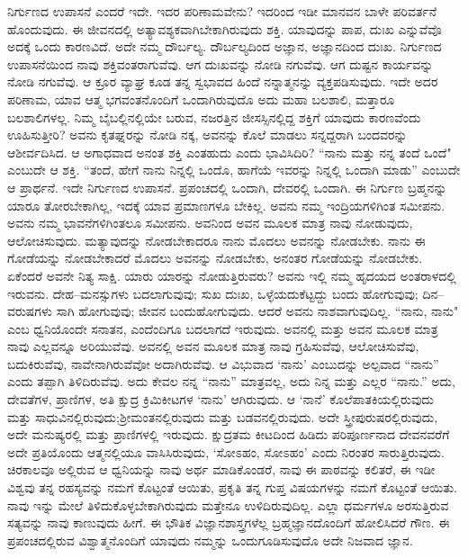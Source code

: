 ನಿರ್ಗುಣದ ಉಪಾಸನೆ ಎಂದರೆ ಇದೇ. ಇದರ ಪರಿಣಾಮವೇನು? ಇದರಿಂದ ಇಡೀ ಮಾನವನ ಬಾಳೇ ಪರಿವರ್ತನೆ ಹೊಂದುವುದು. ಈ ಜೀವನದಲ್ಲಿ ಅತ್ಯಾವಶ್ಯಕವಾಗಿ\break ಬೇಕಾಗಿರುವುದು ಶಕ್ತಿ. ಯಾವುದನ್ನು ಪಾಪ, ದುಃಖ ಎನ್ನುವೆವೊ ಅದಕ್ಕೆ ಒಂದು ಕಾರಣವಿದೆ. ಅದೇ ನಮ್ಮ ದೌರ್ಬಲ್ಯ. ದೌರ್ಬಲ್ಯದಿಂದ ಅಜ್ಞಾನ, ಅಜ್ಞಾನದಿಂದ ದುಃಖ. ನಿರ್ಗುಣದ ಉಪಾಸನೆಯಿಂದ ನಾವು ಶಕ್ತಿವಂತರಾಗುವೆವು. ಆಗ ದುಃಖವನ್ನು ನೋಡಿ ನಗುವೆವು. ಆಗ ದುಷ್ಟನ ಕಾರ್ಯವನ್ನು ನೋಡಿ ನಗುವೆವು. ಆ ಕ್ರೂರ ವ್ಯಾಘ್ರ ಕೂಡ ತನ್ನ ಸ್ವಭಾವದ ಹಿಂದೆ ನನ್ನಾತ್ಮನನ್ನು ವ್ಯಕ್ತಪಡಿಸುವುದು. ಇದೇ ಅದರ ಪರಿಣಾಮ, ಯಾವ ಆತ್ಮ ಭಗವಂತನೊಂದಿಗೆ ಒಂದಾಗಿರುವುದೊ ಅದು ಮಹಾ ಬಲಶಾಲಿ, ಮತ್ತಾರೂ ಬಲಶಾಲಿಗಳಲ್ಲ. ನಿಮ್ಮ ಬೈಬಲ್ಲಿನಲ್ಲಿಯೇ ಬರುವ, ನಜರತ್ತಿನ ಜೀಸಸ್ಸಿನಲ್ಲಿದ್ದ ಶಕ್ತಿಗೆ ಯಾವುದು ಕಾರಣವೆಂದು ಊಹಿಸುತ್ತೀರಿ? ಅವನು ಕೃತಘ್ನರನ್ನು ನೋಡಿ ನಕ್ಕ, ಅವನನ್ನು ಕೊಲೆ ಮಾಡಲು ಸನ್ನದ್ದರಾಗಿ ಬಂದವರನ್ನು ಆಶೀರ್ವದಿಸಿದ. ಆ ಅಗಾಧವಾದ ಅನಂತ ಶಕ್ತಿ ಎಂತಹುದು ಎಂದು ಭಾವಿಸಿದಿರಿ? “ನಾನು ಮತ್ತು ನನ್ನ ತಂದೆ ಒಂದೆ" ಎಂಬುದೇ ಆ ಶಕ್ತಿ. “ತಂದೆ, ಹೇಗೆ ನಾನು ನಿನ್ನಲ್ಲಿ ಒಂದೊ, ಹಾಗೆಯೆ ಇವರನ್ನು ನಿನ್ನಲ್ಲಿ ಒಂದಾಗಿ ಮಾಡು'' ಎಂಬುದೇ ಆ ಪ್ರಾರ್ಥನೆ. ಇದೇ ನಿರ್ಗುಣದ ಉಪಾಸನೆ. ಪ್ರಪಂಚದಲ್ಲಿ ಒಂದಾಗಿ, ದೇವರಲ್ಲಿ ಒಂದಾಗಿ. ಈ ನಿರ್ಗುಣ ಬ್ರಹ್ಮನನ್ನು ಯಾರೂ ತೋರಬೇಕಾಗಿಲ್ಲ, ಇದಕ್ಕೆ ಯಾವ ಪ್ರಮಾಣಗಳೂ ಬೇಕಿಲ್ಲ. ಅವನು ನಮ್ಮ ಇಂದ್ರಿಯಗಳಿಗಿಂತ ಸಮೀಪನು. ಅವನು ನಮ್ಮ ಭಾವನೆಗಳಿಗಿಂತಲೂ ಸಮೀಪನು. ಅವನಿಂದ ಅವನ ಮೂಲಕ ಮಾತ್ರ ನಾವು ನೋಡುವುದು, ಆಲೋಚಿಸುವುದು. ಮತ್ಯಾವುದನ್ನು ನೋಡಬೇಕಾದರೂ ನಾನು ಮೊದಲು ಅವನನ್ನು ನೋಡಬೇಕು. ನಾನು ಈ ಗೋಡೆಯನ್ನು ನೋಡಬೇಕಾದರೆ ಮೊದಲು ಅವನನ್ನು ನೋಡಬೇಕು, ಅನಂತರ ಗೋಡೆಯನ್ನು ನೋಡಬೇಕು. ಏಕೆಂದರೆ ಅವನೇ ನಿತ್ಯ ಸಾಕ್ಷಿ. ಯಾರು ಯಾರನ್ನು ನೋಡುತ್ತಿರುವರು? ಅವನು ಇಲ್ಲಿ ನಮ್ಮ ಹೃದಯದ ಅಂತರಾಳದಲ್ಲಿ ಇರುವನು. ದೇಹ–ಮನಸ್ಸುಗಳು ಬದಲಾಗುವುವು; ಸುಖ ದುಃಖ, ಒಳ್ಳೆಯದು\break ಕೆಟ್ಟದ್ದು ಬಂದು ಹೋಗುವುವು; ದಿನ–ವರುಷಗಳು ಸಾಗಿ ಹೋಗುವುವು; ಜೀವನ ಬಂದುಹೋಗುವುದು. ಆದರೆ ಅವನು ನಾಶವಾಗುವುದಿಲ್ಲ. “ನಾನು, ನಾನು" ಎಂಬ ಧ್ವನಿಯೊಂದೇ ಸನಾತನ, ಎಂದೆಂದಿಗೂ ಬದಲಾಗದೆ ಇರುವುದು. ಅವನಲ್ಲಿ ಮತ್ತು ಅವನ ಮೂಲಕ ಮಾತ್ರ ನಾವು ಎಲ್ಲವನ್ನೂ ಅರಿಯುವೆವು. ಅವನಲ್ಲಿ ಅವನ ಮೂಲಕ ಮಾತ್ರ ನಾವು ಗ್ರಹಿಸುವೆವು, ಆಲೋಚಿಸುವೆವು, ಬದುಕಿರುವೆವು, ನಾವೇನಾಗಿರುವೆವೋ ಅದಾಗಿರುವೆವು. ಆ ವಿಭುವಾದ `ನಾನು' ಎಂಬುದನ್ನು ಅಲ್ಪವಾದ “ನಾನು'' ಎಂದು ತಪ್ಪಾಗಿ ತಿಳಿದಿರುವೆವು. ಅದು ಕೇವಲ ನನ್ನ “ನಾನು” ಮಾತ್ರವಲ್ಲ, ಅದು ನಿನ್ನ ಮತ್ತು ಎಲ್ಲರ “ನಾನು.” ಅದು, ದೇವತೆಗಳ, ಪ್ರಾಣಿಗಳ, ಅತಿ ಕ್ಷುದ್ರ ಕ್ರಿಮಿಕೀಟಗಳ `ನಾನು' ಆಗಿರುವುದು. ಆ `ನಾನೆ' ಕೊಲೆಪಾತಕಿಯಲ್ಲಿರುವುದು ಮತ್ತು ಸಾಧುವಿನಲ್ಲಿರುವುದು;\break ಶ‍್ರೀಮಂತನಲ್ಲಿರುವುದು ಮತ್ತು ಬಡವನಲ್ಲಿರುವುದು. ಅದೇ ಸ್ತ್ರೀಪುರುಷರಲ್ಲಿರುವುದು, ಅದೇ ಮನುಷ್ಯರಲ್ಲಿ ಮತ್ತು ಪ್ರಾಣಿಗಳಲ್ಲಿ ಇರುವುದು. ಕ್ಷುದ್ರತಮ ಕೀಟದಿಂದ ಹಿಡಿದು ಪರಿಪೂರ್ಣನಾದ ದೇವನವರೆಗೆ ಅದೇ ಪ್ರತಿಯೊಂದು ಆತ್ಮನಲ್ಲಿಯೂ ವಾಸಿಸಿರುವುದು, `ಸೋಽಹಂ, ಸೋಽಹಂ' ಎಂದು ನಿರಂತರ ಸಾರುತ್ತಿರುವುದು. ಚಿರಕಾಲವೂ ಅಲ್ಲಿರುವ ಆ ಧ್ವನಿಯನ್ನು ನಾವು ಅರ್ಥ ಮಾಡಿಕೊಂಡರೆ, ನಾವು ಈ ಪಾಠವನ್ನು ಕಲಿತರೆ, ಈ ಇಡೀ ವಿಶ್ವವು ತನ್ನ ರಹಸ್ಯವನ್ನು ನಮಗೆ ಕೊಟ್ಟಂತೆ ಆಯಿತು, ಪ್ರಕೃತಿ ತನ್ನ ಗುಪ್ತ ವಿಷಯಗಳನ್ನು ನಮಗೆ ಕೊಟ್ಟಂತೆ ಆಯಿತು. ನಾವು ಇನ್ನು ಮೇಲೆ ತಿಳಿದುಕೊಳ್ಳಬೇಕಾಗಿರುವುದು ಮತ್ತೇನೂ ಉಳಿದಿರುವುದಿಲ್ಲ. ಎಲ್ಲಾ ಧರ್ಮಗಳೂ ಅರಸುತ್ತಿರುವ ಸತ್ಯವನ್ನು ನಾವು ಕಾಣುವುದು ಹೀಗೆ. ಈ ಭೌತಿಕ ವಿಜ್ಞಾನಶಾಸ್ತ್ರಗಳೆಲ್ಲ ಬ್ರಹ್ಮಜ್ಞಾನದೊಂದಿಗೆ ಹೋಲಿಸಿದರೆ ಗೌಣ. ಈ ಪ್ರಪಂಚದಲ್ಲಿರುವ ವಿಶ್ವಾತ್ಮನೊಂದಿಗೆ ಯಾವುದು ನಮ್ಮನ್ನು ಒಂದುಗೂಡಿಸುವುದೊ ಅದೇ ನಿಜವಾದ ಜ್ಞಾನ.

